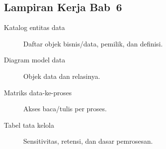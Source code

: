 \subsection*{Lampiran Kerja Bab~6}
\begin{description}
  \item[Katalog entitas data] Daftar objek bisnis/data, pemilik, dan definisi.
  \item[Diagram model data] Objek data dan relasinya.
  \item[Matriks data-ke-proses] Akses baca/tulis per proses.
  \item[Tabel tata kelola] Sensitivitas, retensi, dan dasar pemrosesan.
\end{description}
\setlength{\emergencystretch}{0pt}
